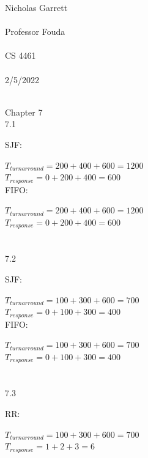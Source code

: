 \documentclass[12pt, a4paper]{article}
\begin{document}
\noindent
Nicholas Garrett\\ \\
Professor Fouda\\ \\
CS 4461\\ \\
2/5/2022\\ \\


\begin{center}
\end{center}

\noindent
Chapter 7\\

7.1

SJF:

\(T_{turnarround} = 200 + 400 + 600 = 1200\)\\

\(T_{response} = 0 + 200 + 400 =600\)\\

FIFO:

\(T_{turnarround} = 200 + 400 + 600 = 1200\)\\

\(T_{response} = 0 + 200 + 400 =600\)\\ \\ \\

7.2

SJF:

\(T_{turnarround} = 100 + 300 + 600 = 700\)\\

\(T_{response} = 0 + 100 + 300 =400\)\\

FIFO:

\(T_{turnarround} = 100 + 300 + 600 = 700\)\\

\(T_{response} = 0 + 100 + 300 = 400\)\\ \\ \\

7.3

RR:

\(T_{turnarround} = 100 + 300 + 600 = 700\)\\

\(T_{response} = 1 + 2 + 3 =6\)\\ \\ \\
\end{document}
